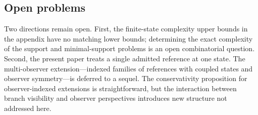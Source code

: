 \subsection*{Open problems}

Two directions remain open. First, the finite-state complexity upper bounds in the appendix have no matching lower bounds; determining the exact complexity of the support and minimal-support problems is an open combinatorial question. Second, the present paper treats a single admitted reference at one state. The multi-observer extension---indexed families of references with coupled states and observer symmetry---is deferred to a sequel. The conservativity proposition for observer-indexed extensions is straightforward, but the interaction between branch visibility and observer perspectives introduces new structure not addressed here.
